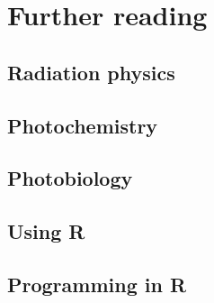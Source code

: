 
\chapter{Further reading}\label{chap:R:readings}

\section{Radiation physics}

\section{Photochemistry}

\section{Photobiology}

\section{Using R}

\section{Programming in R}

\nocite{*}
